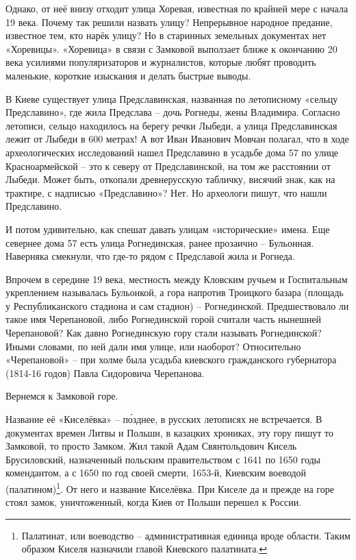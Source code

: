 Однако, от неё внизу отходит улица Хоревая, известная по крайней мере с начала 19 века. Почему так решили назвать улицу? Непрерывное народное предание, известное тем, кто нарёк улицу? Но в старинных земельных документах нет «Хоревицы». «Хоревица» в связи с Замковой выползает ближе к окончанию 20 века усилиями популяризаторов и журналистов, которые любят проводить маленькие, короткие изыскания и делать быстрые выводы.

В Киеве существует улица Предславинская, названная по летописному «сельцу Предславино», где жила Предслава – дочь Рогнеды, жены Владимира. Согласно летописи, сельцо находилось на берегу речки Лыбеди, а улица Предславинская лежит от Лыбеди в 600 метрах! А вот Иван Иванович Мовчан полагал, что в ходе археологических исследований нашел Предславино в усадьбе дома 57 по улице Красноармейской – это к северу от Предславинской, на том же расстоянии от Лыбеди. Может быть, откопали древнерусскую табличку, висячий знак, как на трактире, с надписью «Предславино»? Нет. Но археологи пишут, что нашли Предславино.

И потом удивительно, как спешат давать улицам «исторические» имена. Еще севернее дома 57 есть улица Рогнединская, ранее прозаично – Бульонная. Наверняка смекнули, что где-то рядом с Предславой  жила и Рогнеда. 

Впрочем в середине 19 века, местность между Кловским ручьем и Госпитальным укреплением называлась Бульонкой, а гора напротив Троицкого базара (площадь у Республиканского стадиона и сам стадион) – Рогнединской. Предшествовало ли такое имя Черепановой, либо Рогнединской горой считали часть нынешней Черепановой? Как давно Рогнединскую гору стали называть Рогнединской? Иными словами, по ней дали имя улице, или наоборот? Относительно «Черепановой» – при холме была усадьба киевского гражданского губернатора (1814-16 годов) Павла Сидоровича Черепанова.

Вернемся к Замковой горе. 

Название её «Киселёвка» – п\'озднее, в русских летописях не встречается. В документах времен Литвы и Польши, в казацких хрониках, эту гору пишут то Замковой, то просто Замком. Жил такой Адам Свянтольдович Кисель Брусиловский, назначенный польским правительством с 1641 по 1650 годы комендантом, а с 1650 по год своей смерти, 1653-й, Киевским воеводой (палатином)\footnote{Палатинат, или воеводство – административная единица вроде области. Таким образом Киселя назначили главой Киевского палатината.}. От него и название Киселёвка. При Киселе да и прежде на горе стоял замок, уничтоженный, когда Киев от Польши перешел к России.

